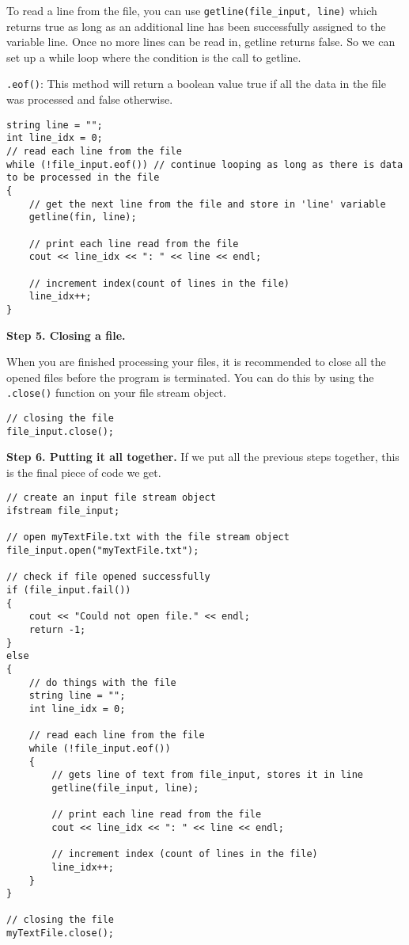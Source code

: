 To read a line from the file, you can use \texttt{getline(file_input, line)} which returns true as long as an additional line has been successfully assigned to the variable line. Once no more lines can be read in, getline returns false. So we can set up a while loop where the condition is the call to getline. 

\texttt{.eof()}: This method will return a boolean value true if all the data in the file was processed and false otherwise.

\begin{verbatim}
string line = "";
int line_idx = 0;
// read each line from the file
while (!file_input.eof()) // continue looping as long as there is data to be processed in the file
{
    // get the next line from the file and store in 'line' variable
    getline(fin, line);

    // print each line read from the file
    cout << line_idx << ": " << line << endl;

    // increment index(count of lines in the file)
    line_idx++;   
}
\end{verbatim}

\textbf{Step 5. Closing a file.}

When you are finished processing your files, it is recommended to close all the opened files before the program is terminated. You can do this by using the \texttt{.close()} function on your file stream object.

\begin{verbatim}
// closing the file
file_input.close();
\end{verbatim}


\textbf{Step 6. Putting it all together.}
If we put all the previous steps together, this is the final piece of code we get.

\begin{verbatim}
// create an input file stream object
ifstream file_input;

// open myTextFile.txt with the file stream object
file_input.open("myTextFile.txt"); 

// check if file opened successfully
if (file_input.fail())
{
    cout << "Could not open file." << endl;
    return -1;
}
else
{
    // do things with the file
    string line = "";
    int line_idx = 0;

    // read each line from the file
    while (!file_input.eof())
    {
        // gets line of text from file_input, stores it in line
        getline(file_input, line);

        // print each line read from the file
        cout << line_idx << ": " << line << endl;

        // increment index (count of lines in the file)
        line_idx++;   
    }
}

// closing the file
myTextFile.close();
\end{verbatim}

